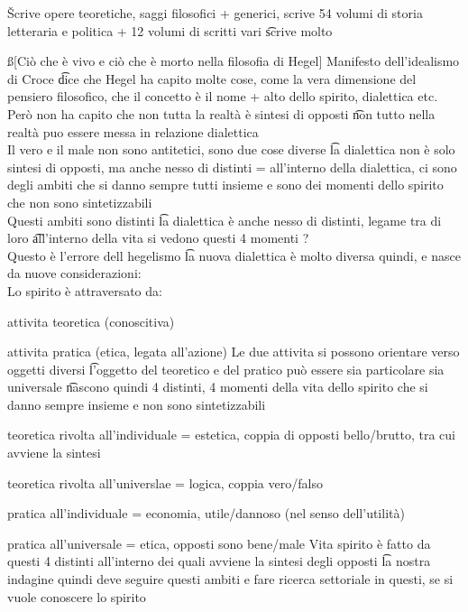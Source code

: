 \documentclass[12pt]{article}
\begin{document}
\v

Scrive opere teoretiche, saggi filosofici + generici, scrive 54 volumi di storia letteraria e politica + 12 volumi di scritti vari \t scrive molto

\ss[Ciò che è vivo e ciò che è morto nella filosofia di Hegel]
Manifesto dell'idealismo di Croce \t dice che Hegel ha capito molte cose, come la vera dimensione del pensiero filosofico, che il concetto è il nome + alto dello spirito, dialettica etc. \\
Però non ha capito che non tutta la realtà è sintesi di opposti \t non tutto nella realtà puo essere messa in relazione dialettica \\
Il vero e il male non sono antitetici, sono due cose diverse \t la dialettica non è solo sintesi di opposti, ma anche nesso di distinti = all'interno della dialettica, ci sono degli ambiti che si danno sempre tutti insieme e sono dei momenti dello spirito che non sono sintetizzabili \\
Questi ambiti sono distinti \t la dialettica è anche nesso di distinti, legame tra di loro \t all'interno della vita si vedono questi 4 momenti ? \\
Questo è l'errore dell hegelismo \t la nuova dialettica è molto diversa quindi, e nasce da nuove considerazioni: \\
Lo spirito è attraversato da:
\bi
  \item attivita teoretica (conoscitiva)
  \item attivita pratica (etica, legata all'azione)
\ei
Le due attivita si possono orientare verso oggetti diversi \t l'oggetto del teoretico e del pratico può essere sia particolare sia universale \t nascono quindi 4 distinti, 4 momenti della vita dello spirito che si danno sempre insieme e non sono sintetizzabili
\bi
  \item teoretica rivolta all'individuale = estetica, coppia di opposti bello/brutto, tra cui avviene la sintesi
  \item teoretica rivolta all'universlae = logica, coppia vero/falso
  \item pratica all'individuale = economia, utile/dannoso (nel senso dell'utilità)
  \item pratica all'universale = etica, opposti sono bene/male
\ei
Vita spirito è fatto da questi 4 distinti all'interno dei quali avviene la sintesi degli opposti \t la nostra indagine quindi deve seguire questi ambiti e fare ricerca settoriale in questi, se si vuole conoscere lo spirito
\end{document}
